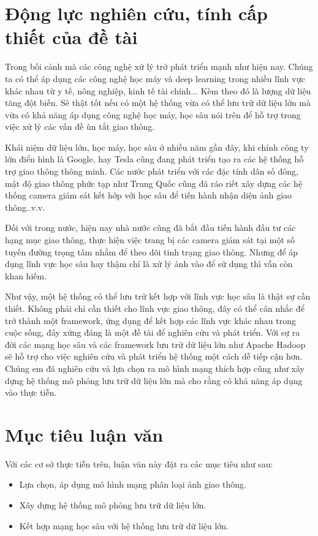 \section*{Động lực nghiên cứu, tính cấp thiết của đề tài}
	Trong bối cảnh mà các công nghệ xử lý trở phát triển mạnh như hiện nay. Chúng ta có thể áp dụng các công nghệ học máy và deep learning trong nhiều lĩnh vực khác nhau từ y tế, nông nghiệp, kinh tế tài chính... Kèm theo đó là lượng dữ liệu tăng đột biến. Sẽ thật tốt nếu có một hệ thống vừa có thể lưu trữ dữ liệu lớn mà vừa có khả năng áp dụng công nghệ học máy, học sâu nói trên để hỗ trợ trong việc xử lý các vấn đề ùn tắt giao thông.\par 
	Khái niệm dữ liệu lớn, học máy, học sâu ở nhiều năm gần đây, khi chính công ty lớn điển hình là Google, hay Tesla cũng đang phát triển tạo ra các hệ thống hỗ trợ giao thông thông minh. Các nước phát triển với các đặc tính dân số đông, mật độ giao thông phức tạp như Trung Quốc cũng đã ráo riết xây dựng các hệ thống camera giám sát kết hớp với học sâu để tiến hành nhận diện ảnh giao thông..v.v.\par 
	Đối với trong nước, hiện nay nhà nước cũng đã bắt đầu tiến hành đầu tư các hạng mục giao thông, thực hiện việc trang bị các camera giám sát tại một số tuyến đường trọng tâm nhằm để theo dõi tinh trạng giao thông. Nhưng để áp dụng lĩnh vực học sâu hay thậm chí là xử lý ảnh vào để sử dụng thì vẫn còn khan hiếm.\par 
	Như vậy, một hệ thống có thể lưu trữ kết hợp với lĩnh vực học sâu là thật sự cần thiết. Không phải chỉ cần thiết cho lĩnh vực giao thông, đây có thể cân nhắc để trở thành một framework, ứng dụng để kết hợp các lĩnh vực khác nhau trong cuộc sống, đây xứng đáng là một đề tài để nghiên cứu và phát triển. Với sự ra đời các mạng học sâu và các framework lưu trữ dữ liệu lớn như Apache Hadoop sẽ hỗ trợ cho việc nghiên cứu và phát triển hệ thống một cách dễ tiếp cận hơn. Chúng em đã nghiên cứu và lựa chọn ra mô hình mạng thích hợp cũng như xây dựng hệ thống mô phỏng lưu trữ dữ liệu lớn mà cho rằng có khả năng áp dụng vào thực tiễn.
	
\section*{Mục tiêu luận văn}		
Với các cơ sở thực tiễn trên, luận văn này đặt ra các mục tiêu như sau:
\begin{itemize}
	\item Lựa chọn, áp dụng mô hình mạng phân loại ảnh giao thông.
	\item Xây dựng hệ thống mô phỏng lưu trữ dữ liệu lớn.
	\item Kết hợp mạng học sâu với hệ thống lưu trữ dữ liệu lớn.
\end{itemize}

